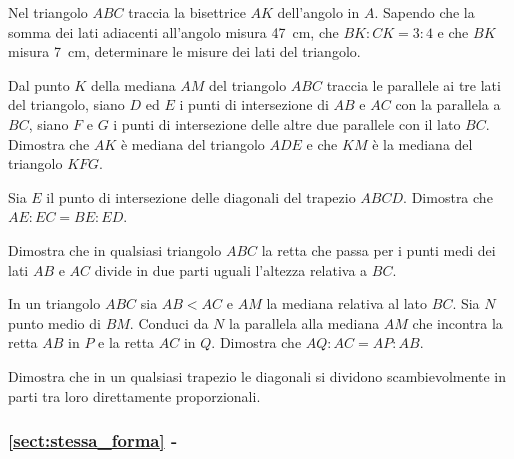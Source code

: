 \begin{multicols}{2}
\begin{esercizio}
\label{ese:6.45}
Nel triangolo \(ABC\) traccia la bisettrice \(AK\) dell'angolo in \(A\). 
Sapendo che la somma dei lati adiacenti all'angolo misura 47~cm, che 
\(BK : CK = 3 : 4\) e che \(BK\) misura 7~cm, determinare le misure dei 
lati del triangolo.
\end{esercizio}

\begin{esercizio}
\label{ese:6.46}
Dal punto \(K\) della mediana \(AM\) del triangolo \(ABC\) traccia le 
parallele ai tre lati del triangolo, siano \(D\) ed \(E\) i punti di 
intersezione di \(AB\) e \(AC\) con la parallela a \(BC\), siano \(F\) e \(G\) 
i punti di intersezione delle altre due parallele con il lato \(BC\). 
Dimostra che \(AK\) è mediana del triangolo \(ADE\) e che \(KM\) è la 
mediana del triangolo \(KFG\).
\end{esercizio}

\begin{esercizio}
\label{ese:6.47}
Sia \(E\) il punto di intersezione delle diagonali del trapezio \(ABCD\). 
Dimostra che \(AE : EC = BE : ED\).
\end{esercizio}

\begin{esercizio}
\label{ese:6.48}
Dimostra che in qualsiasi triangolo \(ABC\) la retta che passa per i 
punti medi dei lati \(AB\) e \(AC\) divide in due parti uguali l'altezza 
relativa a \(BC\).
\end{esercizio}

\begin{esercizio}
\label{ese:6.49}
In un triangolo \(ABC\) sia \(AB<AC\) e \(AM\) la mediana relativa al lato 
\(BC\). Sia \(N\) punto medio di \(BM\). Conduci da \(N\) la parallela alla 
mediana \(AM\) che incontra la retta \(AB\) in \(P\) e la retta \(AC\) in 
\(Q\). Dimostra che \(AQ : AC = AP : AB\).
\end{esercizio}

\begin{esercizio}
\label{ese:6.50}
Dimostra che in un qualsiasi trapezio le diagonali si dividono 
scambievolmente in parti tra loro direttamente proporzionali.
\end{esercizio}

\end{multicols}

\begingroup
\hypersetup{linkcolor=black}
\subsubsection*{\ref{sect:stessa_forma} - }
\endgroup

